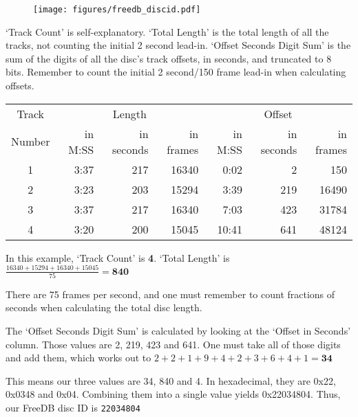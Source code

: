 \begin{figure}[h]
\texttt{[image: figures/freedb\_discid.pdf]}
\end{figure}
\par
\noindent
`Track Count' is self-explanatory.
`Total Length' is the total length of all the tracks, not
counting the initial 2 second lead-in.
`Offset Seconds Digit Sum' is the sum of the digits of all
the disc's track offsets, in seconds, and truncated to 8 bits.
Remember to count the initial 2 second/150 frame lead-in when calculating
offsets.
\begin{table}[h]
\begin{tabular}{|c||r|r|r||r|r|r|}
\hline
Track & \multicolumn{3}{c||}{Length} & \multicolumn{3}{c|}{Offset} \\
Number & in M:SS & in seconds & in frames & in M:SS & in seconds & in frames \\
\hline
1 & 3:37 & 217 & 16340 & 0:02 & 2 & 150 \\
2 & 3:23 & 203 & 15294 & 3:39 & 219 & 16490 \\
3 & 3:37 & 217 & 16340 & 7:03 & 423 & 31784 \\
4 & 3:20 & 200 & 15045 & 10:41 & 641 & 48124 \\
\hline
\end{tabular}
\end{table}
\par
\noindent
In this example, `Track Count' is \textbf{4}.
`Total Length' is
$\frac{16340 + 15294 + 16340 + 15045}{75} = \textbf{840}$

There are 75 frames per second, and one must remember to count
fractions of seconds when calculating the total disc length.

The `Offset Seconds Digit Sum' is calculated by looking at the
`Offset in Seconds' column.
Those values are 2, 219, 423 and 641.
One must take all of those digits and add them, which works out to
$2 + 2 + 1 + 9 + 4 + 2 + 3 + 6 + 4 + 1 = \textbf{34}$

This means our three values are 34, 840 and 4.
In hexadecimal, they are 0x22, 0x0348 and 0x04.
Combining them into a single value yields 0x22034804.
Thus, our FreeDB disc ID is \texttt{22034804}

